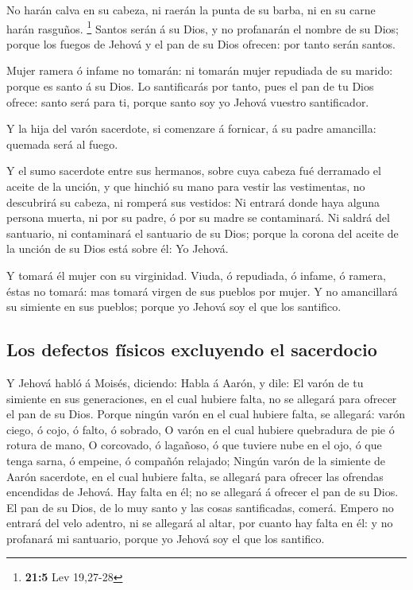  No harán calva en su cabeza, ni raerán la punta de su
barba, ni en su carne harán rasguños. \footnote{\textbf{21:5} Lev
  19,27-28}  Santos serán á su Dios, y no profanarán el
nombre de su Dios; porque los fuegos de Jehová y el pan de su Dios
ofrecen: por tanto serán santos.

 Mujer ramera ó infame no tomarán: ni tomarán mujer
repudiada de su marido: porque es santo á su Dios.  Lo
santificarás por tanto, pues el pan de tu Dios ofrece: santo será para
ti, porque santo soy yo Jehová vuestro santificador.

 Y la hija del varón sacerdote, si comenzare á fornicar, á
su padre amancilla: quemada será al fuego.

 Y el sumo sacerdote entre sus hermanos, sobre cuya
cabeza fué derramado el aceite de la unción, y que hinchió su mano para
vestir las vestimentas, no descubrirá su cabeza, ni romperá sus
vestidos:  Ni entrará donde haya alguna persona muerta,
ni por su padre, ó por su madre se contaminará.  Ni
saldrá del santuario, ni contaminará el santuario de su Dios; porque la
corona del aceite de la unción de su Dios está sobre él: Yo Jehová.

 Y tomará él mujer con su virginidad. 
Viuda, ó repudiada, ó infame, ó ramera, éstas no tomará: mas tomará
virgen de sus pueblos por mujer.  Y no amancillará su
simiente en sus pueblos; porque yo Jehová soy el que los santifico.

\hypertarget{los-defectos-fuxedsicos-excluyendo-el-sacerdocio}{%
\subsection{Los defectos físicos excluyendo el
sacerdocio}\label{los-defectos-fuxedsicos-excluyendo-el-sacerdocio}}

 Y Jehová habló á Moisés, diciendo:  Habla
á Aarón, y dile: El varón de tu simiente en sus generaciones, en el cual
hubiere falta, no se allegará para ofrecer el pan de su Dios.
 Porque ningún varón en el cual hubiere falta, se
allegará: varón ciego, ó cojo, ó falto, ó sobrado,  O
varón en el cual hubiere quebradura de pie ó rotura de mano,
 O corcovado, ó lagañoso, ó que tuviere nube en el ojo, ó
que tenga sarna, ó empeine, ó compañón relajado;  Ningún
varón de la simiente de Aarón sacerdote, en el cual hubiere falta, se
allegará para ofrecer las ofrendas encendidas de Jehová. Hay falta en
él; no se allegará á ofrecer el pan de su Dios.  El pan
de su Dios, de lo muy santo y las cosas santificadas, comerá.
 Empero no entrará del velo adentro, ni se allegará al
altar, por cuanto hay falta en él: y no profanará mi santuario, porque
yo Jehová soy el que los santifico.

